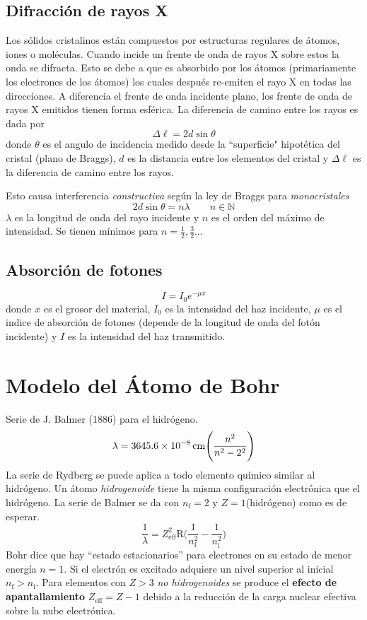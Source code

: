 \documentclass[10pt,twocolumn,titlepage]{article}
\newcommand{\inpar}[1]{\Bigg( #1 \Bigg)} %
\newcommand{\inicial}{\textrm{i}}
\newcommand{\final}{\textrm{f}}
\newcommand{\Rydberg}{\textrm{R}}
\begin{document}
\subsection{Difracción de rayos X}
Los sólidos cristalinos están compuestos por estructuras regulares de átomos, iones o moléculas. Cuando incide un frente de onda de rayos X sobre estos la onda se difracta. Esto se debe a que es absorbido por los átomos (primariamente los electrones de los átomos) los cuales después re-emiten el rayo X en todas las direcciones. A diferencia el frente de onda incidente plano, los frente de onda de rayos X emitidos tienen forma esférica. La diferencia de camino entre los rayos es dada por
$$\Delta \ell =2d\sin \theta $$
donde $\theta$ es el angulo de incidencia medido desde la ``superficie"{} hipotética del cristal (plano de Braggs), $d$ es la distancia entre los elementos del cristal y $\Delta\ell$ es la diferencia de camino entre los rayos.

Esto causa interferencia \emph{constructiva} según la ley de Braggs para \emph{monocristales}
$$2d\sin \theta = n\lambda \qquad n\in \mathbb{N}$$
$\lambda$ es la longitud de onda del rayo incidente y $n$ es el orden del máximo de intensidad. Se tienen mínimos para $n=\frac{1}{2},\frac{3}{2}\ldots$
\subsection{Absorción de fotones}
$$ I=I_0 e^{-\mu x}$$
donde $x$ es el grosor del material, $I_0$ es la intensidad del haz incidente, $\mu$ es el indice de absorción de fotones (depende de la longitud de onda del fotón incidente) y $I$ es la intensidad del haz transmitido.
\section{Modelo del Átomo de Bohr}
Serie de J. Balmer (1886) para el hidrógeno.
$$ \lambda = \SI{3645.6E-8}{\cm} \inpar{\frac{n^2}{n^2-2^2} }$$
La serie de Rydberg se puede aplica a todo elemento químico similar al hidrógeno. Un átomo \emph{hidrogenoide} tiene la misma configuración electrónica que el hidrógeno. La serie de Balmer se da con $n_\final=2$ y $Z=1$(hidrógeno) como es de esperar.
$$ \frac{1}{\lambda}=Z^2_{\textrm{eff} }\Rydberg\inpar{\frac{1}{n^2_\final}-\frac{1}{n^2_\inicial}} $$
Bohr dice que hay ``estado estacionarios'' para electrones en su estado de menor energía $n=1$. Si el electrón es excitado adquiere un nivel superior al inicial $n_\textrm{f}>n_\inicial$. Para elementos con $Z>3$ \emph{no hidrogenoides} se produce el \textbf{efecto de apantallamiento} $Z_{\textrm{eff} }=Z-1$ debido a la reducción de la carga nuclear efectiva sobre la nube electrónica.
\end{document}
